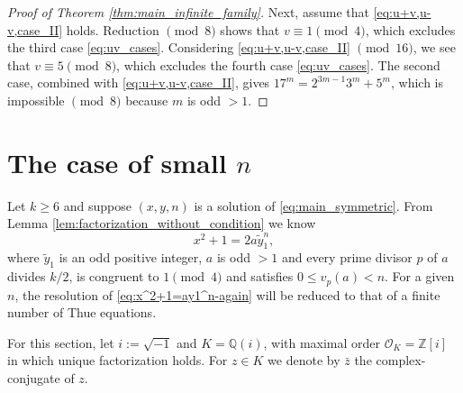 \documentclass[12pt]{amsart}
\numberwithin{equation}{section}
\theoremstyle{definition}
\theoremstyle{remark}
\newcommand{\ZZ}{\mathbb{Z}}
\newcommand{\QQ}{\mathbb{Q}}
\newcommand{\OK}{\mathcal{O}_K}
\newcommand{\ty}{\tilde{y}}
\begin{document}
\begin{proof}[Proof of Theorem \ref{thm:main_infinite_family}]
Next, assume that \eqref{eq:u+v,u-v,case_II} holds. Reduction
$\pmod 8$ shows that $v\equiv 1\pmod 4$, which excludes the third
case \eqref{eq:uv_cases}. Considering \eqref{eq:u+v,u-v,case_II}
$\pmod{16}$, we see that $v\equiv 5\pmod 8$, which excludes the
fourth case \eqref{eq:uv_cases}. The second case, combined with
\eqref{eq:u+v,u-v,case_II}, gives $17^m=2^{3m-1}3^m+5^m$, which is
impossible $\pmod 8$ because $m$ is odd $>1$.
\end{proof}


\section{The case of small $n$} \label{sec:small_n}

Let $k\ge 6$ and suppose $(x,y,n)$ is a solution of \eqref{eq:main_symmetric}. 
From Lemma \ref{lem:factorization_without_condition} we know
\begin{equation} \label{eq:x^2+1=ay1^n-again}
    x^2 + 1=2a\ty_1^n,
\end{equation}
where $\ty_1$ is an odd positive integer, $a$ is odd $>1$ and every prime divisor $p$ of $a$ divides $k/2$, is congruent to $1\pmod 4$ and satisfies $0\leq v_p(a) < n$. For a given $n$, the resolution of \eqref{eq:x^2+1=ay1^n-again} will be reduced to that of a finite number of Thue equations. 

For this section, let $i:=\sqrt{-1}$ and $K=\QQ(i)$, with maximal order $\OK=\ZZ[i]$ in which unique factorization holds. For $z\in K$ we denote by $\bar{z}$ the complex-conjugate of $z$. 
\end{document}
